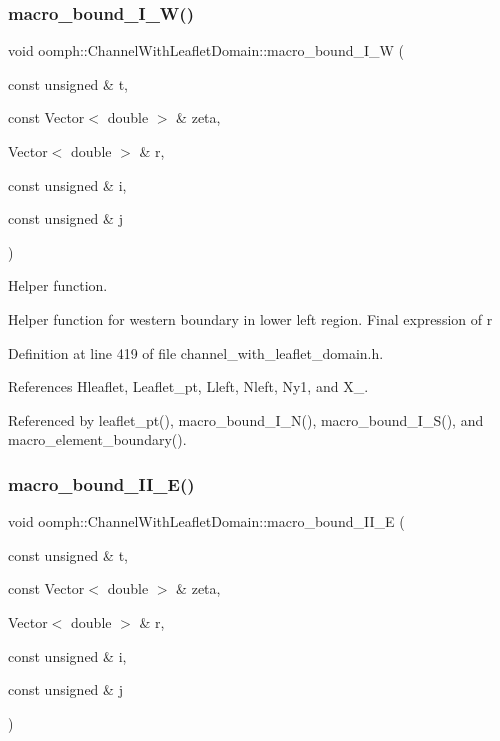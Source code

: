 \subsubsection{\texorpdfstring{macro\+\_\+bound\+\_\+\+I\+\_\+\+W()}{macro\_bound\_I\_W()}}
{\footnotesize\ttfamily void oomph\+::\+Channel\+With\+Leaflet\+Domain\+::macro\+\_\+bound\+\_\+\+I\+\_\+W (\begin{DoxyParamCaption}\item[{const unsigned \&}]{t,  }\item[{const Vector$<$ double $>$ \&}]{zeta,  }\item[{Vector$<$ double $>$ \&}]{r,  }\item[{const unsigned \&}]{i,  }\item[{const unsigned \&}]{j }\end{DoxyParamCaption})\hspace{0.3cm}{\ttfamily [protected]}}



Helper function. 

Helper function for western boundary in lower left region. Final expression of r 

Definition at line 419 of file channel\+\_\+with\+\_\+leaflet\+\_\+domain.\+h.



References Hleaflet, Leaflet\+\_\+pt, Lleft, Nleft, Ny1, and X\+\_.



Referenced by leaflet\+\_\+pt(), macro\+\_\+bound\+\_\+\+I\+\_\+\+N(), macro\+\_\+bound\+\_\+\+I\+\_\+\+S(), and macro\+\_\+element\+\_\+boundary().

\mbox{\label{classoomph_1_1ChannelWithLeafletDomain_a9083a5ac562feb1cd33d78e6cc18b257}} 
\subsubsection{\texorpdfstring{macro\+\_\+bound\+\_\+\+I\+I\+\_\+\+E()}{macro\_bound\_II\_E()}}
{\footnotesize\ttfamily void oomph\+::\+Channel\+With\+Leaflet\+Domain\+::macro\+\_\+bound\+\_\+\+I\+I\+\_\+E (\begin{DoxyParamCaption}\item[{const unsigned \&}]{t,  }\item[{const Vector$<$ double $>$ \&}]{zeta,  }\item[{Vector$<$ double $>$ \&}]{r,  }\item[{const unsigned \&}]{i,  }\item[{const unsigned \&}]{j }\end{DoxyParamCaption})\hspace{0.3cm}{\ttfamily [protected]}}



